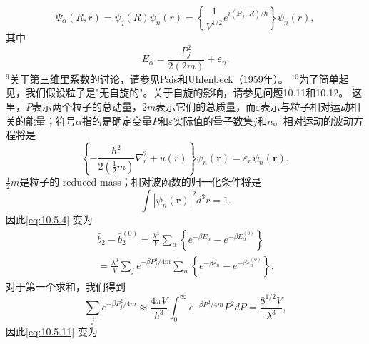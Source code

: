\begin{equation}\tag{10.5.7}\label{eq:10.5.7}
\Psi _ { \alpha } ( R , r ) = \psi _ { j } ( R ) \psi _ { n } ( r ) = \left\{ \frac { 1 } { V ^{1 / 2} } e ^{i ( \mathbf { P} _ { j } \cdot R ) / \hbar } \right\} \psi _ { n } ( r ) ,
\end{equation}
其中
\begin{equation}\tag{10.5.8}\label{eq:10.5.8}
E _ { \alpha } = \frac { P _ { j } ^{2} } { 2 ( 2 m ) } + \varepsilon _ { n } .
\end{equation}
\(^{9}\)关于第三维里系数的讨论，请参见Pais和Uhlenbeck（1959年）。
\(^{10}\)为了简单起见，我们假设粒子是"无自旋的"。关于自旋的影响，请参见问题10.11和10.12。
这里，\(P\)表示两个粒子的总动量，\(2m\)表示它们的总质量，而\(\varepsilon\)表示与粒子相对运动相关的能量；符号\(\alpha\)指的是确定变量\(P\)和\(\varepsilon\)实际值的量子数集\(j\)和\(n\)。相对运动的波动方程将是
\begin{equation}\tag{10.5.9}\label{eq:10.5.9}
\left\{ - \frac { \hbar ^{2} } { 2 \left( \frac { 1 } { 2 } m \right) } \nabla _ { r } ^{2} + u ( r ) \right\} \psi _ { n } ( \pmb { r } ) = \varepsilon _ { n } \psi _ { n } ( \pmb { r } ) ,
\end{equation}
\(\frac{1}{2}m\)是粒子的 reduced mass；相对波函数的归一化条件将是
\begin{equation}\tag{10.5.10}\label{eq:10.5.10}
\int | \psi _ { n } ( \mathbf { r } ) | ^{2} d ^{3} r = 1 .
\end{equation}
因此\autoref{eq:10.5.4} 变为
\begin{equation}\tag{10.5.11}\label{eq:10.5.11}
\begin{array}{r} { \bar { b } _ { 2 } - \bar { b } _ { 2 } ^{( 0 )} = \frac { \lambda ^{3} } { V } \sum _ { \alpha } \left\{ e ^{- \beta E _ { \alpha} } - e ^{- \beta E _ { \alpha} ^{( 0 )} } \right\} } \\{ = \frac { \lambda ^{3} } { V } \sum _ { j } e ^{- \beta P _ { j} ^{2} / 4 m } \sum _ { n } \left\{ e ^{- \beta \varepsilon _ { n} } - e ^{- \beta \varepsilon _ { n} ^{( 0 )} } \right\} . } \end{array}
\end{equation}
对于第一个求和，我们得到
\begin{equation}\tag{10.5.12}\label{eq:10.5.12}
\sum _ { j } e ^{- \beta P _ { j} ^{2} / 4 m } \approx \frac { 4 \pi V } { h ^{3} } \int _ { 0 } ^{\infty} e ^{- \beta P ^ { 2} / 4 m } P ^{2} d P = \frac { 8 ^{1 / 2} V } { \lambda ^{3} } ,
\end{equation}
因此\autoref{eq:10.5.11} 变为
